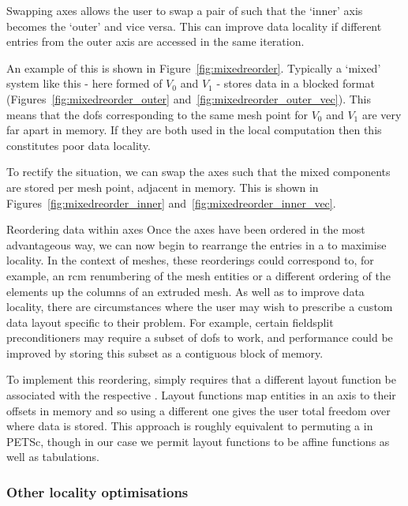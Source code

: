 \begin{paragraph}{Swapping axes}
 allows the user to swap a pair of  such that the `inner' axis becomes the `outer' and vice versa.
This can improve data locality if different entries from the outer axis are accessed in the same iteration.

An example of this is shown in Figure~\ref{fig:mixedreorder}.
Typically a `mixed' system like this - here formed of $V_0$ and $V_1$ - stores data in a blocked format (Figures~\ref{fig:mixedreorder_outer} and~\ref{fig:mixedreorder_outer_vec}).
This means that the \glspl{dof} corresponding to the same mesh point for $V_0$ and $V_1$ are very far apart in memory.
If they are both used in the local computation then this constitutes poor data locality.

To rectify the situation, we can swap the axes such that the mixed components are stored per mesh point, adjacent in memory.
This is shown in Figures~\ref{fig:mixedreorder_inner} and~\ref{fig:mixedreorder_inner_vec}.
\end{paragraph}

\begin{paragraph}{Reordering data within axes}
Once the axes have been ordered in the most advantageous way, we can now begin to rearrange the entries in a  to maximise locality.
In the context of meshes, these reorderings could correspond to, for example, an \gls{rcm} renumbering of the mesh entities or a different ordering of the elements up the columns of an extruded mesh.
As well as to improve data locality, there are circumstances where the user may wish to prescribe a custom data layout specific to their problem.
For example, certain fieldsplit preconditioners may require a subset of \glspl{dof} to work, and performance could be improved by storing this subset as a contiguous block of memory.

To implement this reordering,  simply requires that a different layout function be associated with the respective .
Layout functions map entities in an axis to their offsets in memory and so using a different one gives the user total freedom over where data is stored.
This approach is roughly equivalent to permuting a  in PETSc, though in our case we permit layout functions to be affine functions as well as tabulations.
\end{paragraph}

\subsubsection{Other locality optimisations}

